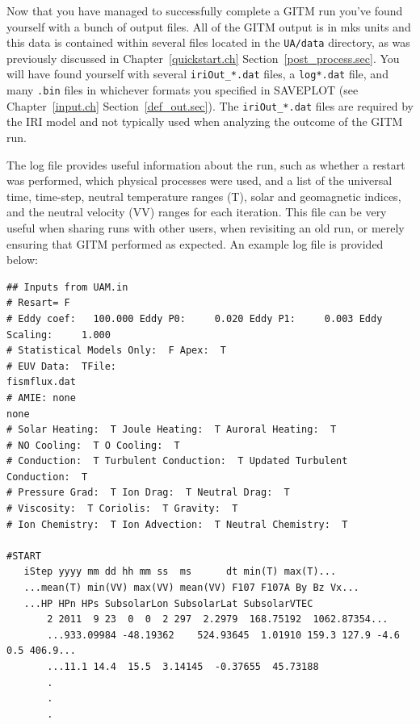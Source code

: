 
Now that you have managed to successfully complete a GITM run you've found yourself with a bunch of output files.  All of the GITM output is in mks units and this data is contained within several files located in the {\tt UA/data} directory, as was previously discussed in Chapter~\ref{quickstart.ch} Section~\ref{post_process.sec}.  You will have found yourself with several {\tt iriOut\_*.dat} files, a {\tt log*.dat} file, and many {\tt .bin} files in whichever formats you specified in SAVEPLOT (see Chapter~\ref{input.ch} Section~\ref{def_out.sec}).  The {\tt iriOut\_*.dat} files are required by the IRI model and not typically used when analyzing the outcome of the GITM run.

The log file provides useful information about the run, such as whether a restart was performed, which physical processes were used, and a list of the universal time, time-step, neutral temperature ranges (T), solar and geomagnetic indices, and the neutral velocity (VV) ranges for each iteration.  This file can be very useful when sharing runs with other users, when revisiting an old run, or merely ensuring that GITM performed as expected.  An example log file is provided below:

\begin{verbatim}
## Inputs from UAM.in
# Resart= F
# Eddy coef:   100.000 Eddy P0:     0.020 Eddy P1:     0.003 Eddy Scaling:     1.000
# Statistical Models Only:  F Apex:  T
# EUV Data:  TFile: 
fismflux.dat                                                                                        
# AMIE: none           
none                                                                                                
# Solar Heating:  T Joule Heating:  T Auroral Heating:  T
# NO Cooling:  T O Cooling:  T
# Conduction:  T Turbulent Conduction:  T Updated Turbulent Conduction:  T
# Pressure Grad:  T Ion Drag:  T Neutral Drag:  T
# Viscosity:  T Coriolis:  T Gravity:  T
# Ion Chemistry:  T Ion Advection:  T Neutral Chemistry:  T
 
#START
   iStep yyyy mm dd hh mm ss  ms      dt min(T) max(T)...
   ...mean(T) min(VV) max(VV) mean(VV) F107 F107A By Bz Vx...
   ...HP HPn HPs SubsolarLon SubsolarLat SubsolarVTEC
       2 2011  9 23  0  0  2 297  2.2979  168.75192  1062.87354...
       ...933.09984 -48.19362    524.93645  1.01910 159.3 127.9 -4.6  0.5 406.9...
       ...11.1 14.4  15.5  3.14145  -0.37655  45.73188
       .
       .
       .
\end{verbatim}

